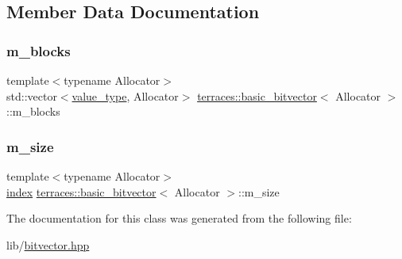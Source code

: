 \subsection{Member Data Documentation}
\mbox{\label{classterraces_1_1basic__bitvector_a65d3b2d2706a757fa305b725508a3830}} 
\subsubsection{\texorpdfstring{m\+\_\+blocks}{m\_blocks}}
{\footnotesize\ttfamily template$<$typename Allocator$>$ \\
std\+::vector$<$\hyperlink{classterraces_1_1basic__bitvector_ad076eceb68c15a18925cd409e6eaac11}{value\+\_\+type}, Allocator$>$ \hyperlink{classterraces_1_1basic__bitvector}{terraces\+::basic\+\_\+bitvector}$<$ Allocator $>$\+::m\+\_\+blocks\hspace{0.3cm}{\ttfamily [protected]}}

\mbox{\label{classterraces_1_1basic__bitvector_ac78f807a89b0bfca92d855ebf1b61206}} 
\subsubsection{\texorpdfstring{m\+\_\+size}{m\_size}}
{\footnotesize\ttfamily template$<$typename Allocator$>$ \\
\hyperlink{namespaceterraces_adbc33ccb543d1634e96d0eb02e472c77}{index} \hyperlink{classterraces_1_1basic__bitvector}{terraces\+::basic\+\_\+bitvector}$<$ Allocator $>$\+::m\+\_\+size\hspace{0.3cm}{\ttfamily [protected]}}



The documentation for this class was generated from the following file\+:\begin{DoxyCompactItemize}
\item 
lib/\hyperlink{bitvector_8hpp}{bitvector.\+hpp}\end{DoxyCompactItemize}
